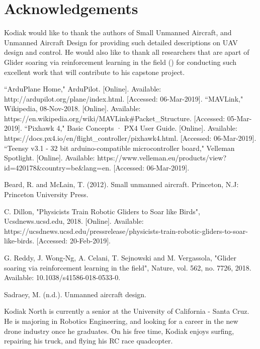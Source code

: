 \documentclass[12pt,journal,compsoc]{IEEEtran}
\begin{document}
\section*{Acknowledgements}
Kodiak would like to thank the authors of Small Unmanned Aircraft, and Unmanned Aircraft Design for providing such detailed descriptions on UAV design and control. He would also like to thank all researchers that are apart of Glider soaring via reinforcement learning in the field (\cite{GliderBirds}) for conducting such excellent work that will contribute to his capstone project.

\begin{thebibliography}{1}
``ArduPlane Home," ArduPilot. [Online]. Available: http://ardupilot.org/plane/index.html. [Accessed: 06-Mar-2019].
``MAVLink," Wikipedia, 08-Nov-2018. [Online]. Available: https://en.wikipedia.org/wiki/MAVLink\#Packet\_Structure. [Accessed: 05-Mar-2019].
``Pixhawk 4," Basic Concepts · PX4 User Guide. [Online]. Available: https://docs.px4.io/en/flight\_controller/pixhawk4.html. [Accessed: 06-Mar-2019].
``Teensy v3.1 - 32 bit arduino-compatible microcontroller board," Velleman Spotlight. [Online]. Available: https://www.velleman.eu/products/view?id=420178\&country=be\&lang=en. [Accessed: 06-Mar-2019].

Beard, R. and McLain, T. (2012). Small unmanned aircraft. Princeton, N.J: Princeton University Press.

C. Dillon, "Physicists Train Robotic Gliders to Soar like Birds", Ucsdnews.ucsd.edu, 2018. [Online]. Available: https://ucsdnews.ucsd.edu/pressrelease/physicists-train-robotic-gliders-to-soar-like-birds. [Accessed: 20-Feb-2019].

G. Reddy, J. Wong-Ng, A. Celani, T. Sejnowski and M. Vergassola, "Glider soaring via reinforcement learning in the field", Nature, vol. 562, no. 7726, 2018. Available: 10.1038/s41586-018-0533-0.

Sadraey, M. (n.d.). Unmanned aircraft design.


\end{thebibliography}


\begin{IEEEbiographynophoto}{Kodiak North}
is currently a senior at the University of California - Santa Cruz. He is majoring in Robotics Engineering, and looking for a career in the new drone industry once he graduates. On his free time, Kodiak enjoys surfing, repairing his truck, and flying his RC race quadcopter.
\end{IEEEbiographynophoto}
\end{document}
